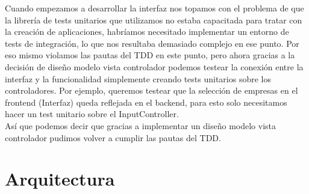 \documentclass[12pt,a4paper]{article}
\begin{document}
	 Cuando empezamos a desarrollar la interfaz nos topamos con el problema de que la librería de tests unitarios que utilizamos no estaba capacitada para tratar con la creación de aplicaciones, habríamos necesitado implementar un entorno de tests de integración, lo que nos resultaba demasiado complejo en ese punto. Por eso mismo violamos las pautas del TDD en este punto, pero ahora gracias a la decisión de diseño modelo vista controlador podemos testear la conexión entre la interfaz y la funcionalidad simplemente creando tests unitarios sobre los controladores. Por ejemplo, queremos testear que la selección de empresas en el frontend (Interfaz) queda reflejada en el backend, para esto solo necesitamos hacer un test unitario sobre el InputController.\\
	Así que podemos decir que gracias a implementar un diseño modelo vista controlador pudimos volver a cumplir las pautas del TDD.\\
\pagebreak

	\section{Arquitectura}
\end{document}
